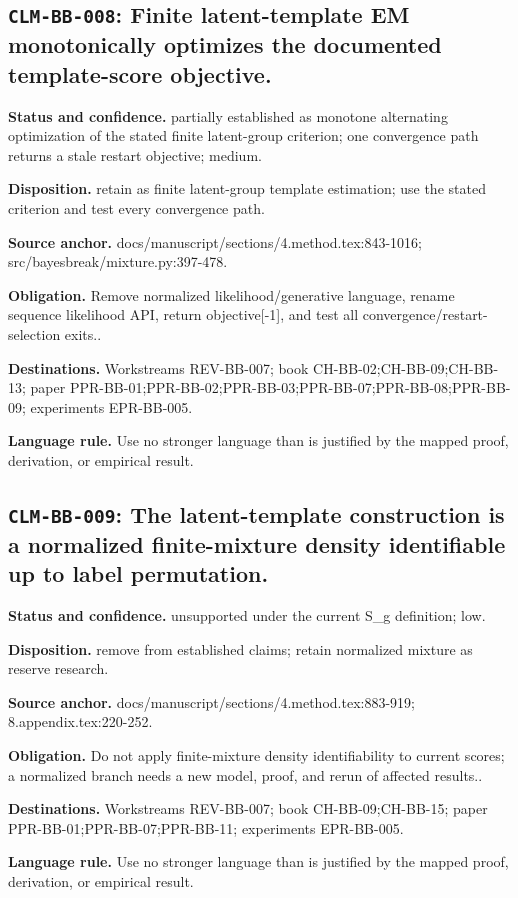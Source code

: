 \subsection[\texttt{CLM-BB-008}]{\texttt{CLM-BB-008}: Finite latent-template EM monotonically optimizes the documented template-score objective.}
\textbf{Status and confidence.} partially established as monotone alternating optimization of the stated finite latent-group criterion; one convergence path returns a stale restart objective; medium.\par
\textbf{Disposition.} retain as finite latent-group template estimation; use the stated criterion and test every convergence path.\par
\textbf{Source anchor.} docs/manuscript/sections/4.method.tex:843-1016; src/bayesbreak/mixture.py:397-478.\par
\textbf{Obligation.} Remove normalized likelihood/generative language, rename sequence likelihood API, return objective[-1], and test all convergence/restart-selection exits..\par
\textbf{Destinations.} Workstreams REV-BB-007; book CH-BB-02;CH-BB-09;CH-BB-13; paper PPR-BB-01;PPR-BB-02;PPR-BB-03;PPR-BB-07;PPR-BB-08;PPR-BB-09; experiments EPR-BB-005.\par
\textbf{Language rule.} Use no stronger language than is justified by the mapped proof, derivation, or empirical result.

\subsection[\texttt{CLM-BB-009}]{\texttt{CLM-BB-009}: The latent-template construction is a normalized finite-mixture density identifiable up to label permutation.}
\textbf{Status and confidence.} unsupported under the current S\_g definition; low.\par
\textbf{Disposition.} remove from established claims; retain normalized mixture as reserve research.\par
\textbf{Source anchor.} docs/manuscript/sections/4.method.tex:883-919; 8.appendix.tex:220-252.\par
\textbf{Obligation.} Do not apply finite-mixture density identifiability to current scores; a normalized branch needs a new model, proof, and rerun of affected results..\par
\textbf{Destinations.} Workstreams REV-BB-007; book CH-BB-09;CH-BB-15; paper PPR-BB-01;PPR-BB-07;PPR-BB-11; experiments EPR-BB-005.\par
\textbf{Language rule.} Use no stronger language than is justified by the mapped proof, derivation, or empirical result.

